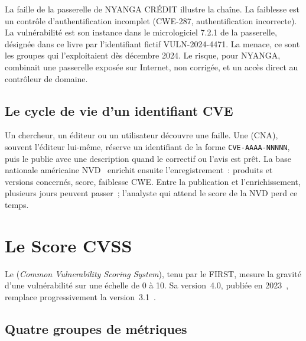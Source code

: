La faille de la passerelle de NYANGA CRÉDIT illustre la chaîne. La
faiblesse est un contrôle d'authentification incomplet (CWE-287,
authentification incorrecte). La vulnérabilité est son instance dans le
micrologiciel 7.2.1 de la passerelle, désignée dans ce livre par
l'identifiant fictif VULN-2024-4471. La menace, ce sont les groupes qui
l'exploitaient dès décembre 2024. Le risque, pour NYANGA, combinait une
passerelle exposée sur Internet, non corrigée, et un accès direct au
contrôleur de domaine.

\subsection{Le cycle de vie d'un identifiant CVE}

Un chercheur, un éditeur ou un utilisateur découvre une faille. Une
 (CNA), souvent l'éditeur lui-même,
réserve un identifiant de la forme \texttt{CVE-AAAA-NNNNN}, puis le publie
avec une description quand le correctif ou l'avis est prêt. La base
nationale américaine NVD~\cite{nistnvd} enrichit ensuite l'enregistrement~:
produits et versions concernés, score, faiblesse CWE. Entre la publication
et l'enrichissement, plusieurs jours peuvent passer~; l'analyste qui attend
le score de la NVD perd ce temps.

\section{Le Score CVSS}
\label{sec:c09-cvss}

Le  (\textit{Common Vulnerability Scoring System}), tenu par
le FIRST, mesure la gravité d'une vulnérabilité sur une échelle de 0 à 10.
Sa version~4.0, publiée en 2023~\cite{first2023cvss4}, remplace
progressivement la version~3.1~\cite{first2019cvss31}.

\subsection{Quatre groupes de métriques}

